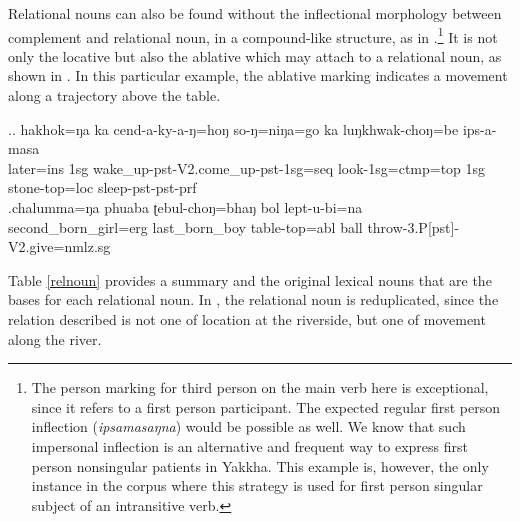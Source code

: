 	
Relational nouns can also be found without the inflectional morphology between complement and relational noun, in a compound-like structure, as in  \Next[a].\footnote{The person marking for third person on the main verb here is exceptional, since it refers to a first person participant. The expected regular first person inflection (\emph{ipsamasaŋna}) would be possible as well. We know that such impersonal inflection is an alternative and frequent way to express first person nonsingular patients in Yakkha. This example is, however, the only instance in the corpus where this strategy is used for first person singular subject of an intransitive verb.} 	It is not only the locative but also the ablative which may attach to a relational noun, as shown in \Next[b]. In this particular example, the ablative marking indicates a movement along a trajectory above the table.
		
 \ex.\ag. hakhok=ŋa  ka  cend-a-ky-a-ŋ=hoŋ so-ŋ=niŋa=go ka  luŋkhwak-choŋ=be  ips-a-masa\\
	later{\sc =ins} {\sc 1sg} wake\_up{\sc -pst-V2.come\_up-pst-1sg=seq} look{\sc -1sg=ctmp=top} {\sc 1sg} stone-top{\sc =loc} sleep{\sc [3sg]-pst-pst-prf}\\
	 
	\bg.chalumma=ŋa phuaba ʈebul-choŋ=bhaŋ bol lept-u-bi=na\\
	second\_born\_girl{\sc =erg} last\_born\_boy table-top{\sc =abl} ball throw{\sc -3.P[pst]-V2.give=nmlz.sg}\\
	
Table \ref{relnoun} provides a summary and the original lexical nouns that are the bases for each relational noun. In \Next, the relational noun is reduplicated, since the relation described is not one of location at the riverside, but one of movement along the river.

